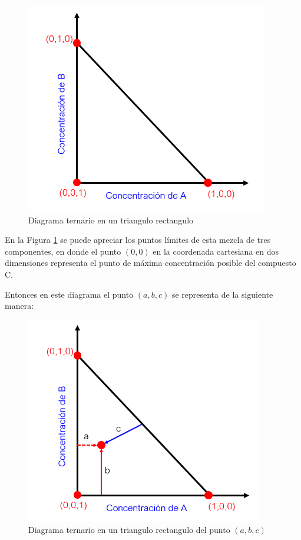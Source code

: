 \documentclass[11pt]{book}
\begin{document}
\begin{figure}[H]
    \centering
    \includegraphics{img/LiquidoLiquido/TrianguloRectangulo.PNG}
    \caption{Diagrama ternario en un triangulo rectangulo}
    \label{fig:MezclaLiqLiqTrianguloRectangulo}
\end{figure}

En la Figura \ref{fig:MezclaLiqLiqTrianguloRectangulo} se puede apreciar los puntos límites de esta mezcla de tres componentes, en donde el punto $(0,0)$ en la coordenada cartesiana en dos dimensiones representa el punto de máxima concentración posible del compuesto C.

Entonces en este diagrama el punto $(a,b,c)$ se representa de la siguiente manera:

\begin{figure}[H]
    \centering
    \includegraphics{img/LiquidoLiquido/TrianguloRectangulo_2.PNG}
    \caption{Diagrama ternario en un triangulo rectangulo del punto $(a,b,c)$}
    \label{fig:MezclaLiqLiqTrianguloRectangulo_2}
\end{figure}
\end{document}

